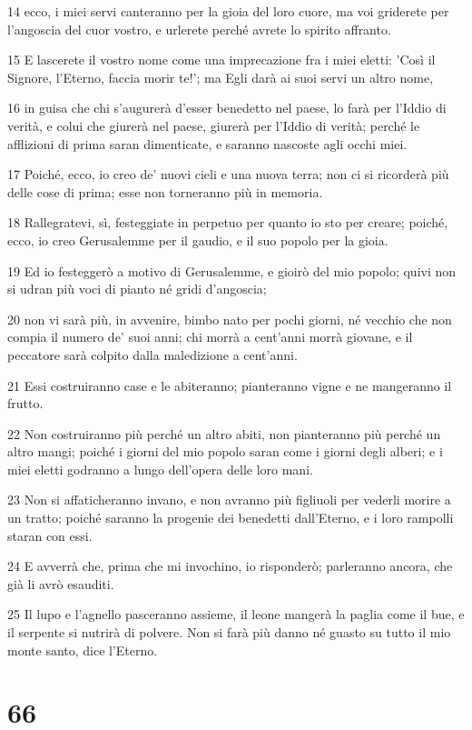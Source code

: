 \par 14 ecco, i miei servi canteranno per la gioia del loro cuore, ma voi griderete per l'angoscia del cuor vostro, e urlerete perché avrete lo spirito affranto.
\par 15 E lascerete il vostro nome come una imprecazione fra i miei eletti: 'Così il Signore, l'Eterno, faccia morir te!'; ma Egli darà ai suoi servi un altro nome,
\par 16 in guisa che chi s'augurerà d'esser benedetto nel paese, lo farà per l'Iddio di verità, e colui che giurerà nel paese, giurerà per l'Iddio di verità; perché le afflizioni di prima saran dimenticate, e saranno nascoste agli occhi miei.
\par 17 Poiché, ecco, io creo de' nuovi cieli e una nuova terra; non ci si ricorderà più delle cose di prima; esse non torneranno più in memoria.
\par 18 Rallegratevi, sì, festeggiate in perpetuo per quanto io sto per creare; poiché, ecco, io creo Gerusalemme per il gaudio, e il suo popolo per la gioia.
\par 19 Ed io festeggerò a motivo di Gerusalemme, e gioirò del mio popolo; quivi non si udran più voci di pianto né gridi d'angoscia;
\par 20 non vi sarà più, in avvenire, bimbo nato per pochi giorni, né vecchio che non compia il numero de' suoi anni; chi morrà a cent'anni morrà giovane, e il peccatore sarà colpito dalla maledizione a cent'anni.
\par 21 Essi costruiranno case e le abiteranno; pianteranno vigne e ne mangeranno il frutto.
\par 22 Non costruiranno più perché un altro abiti, non pianteranno più perché un altro mangi; poiché i giorni del mio popolo saran come i giorni degli alberi; e i miei eletti godranno a lungo dell'opera delle loro mani.
\par 23 Non si affaticheranno invano, e non avranno più figliuoli per vederli morire a un tratto; poiché saranno la progenie dei benedetti dall'Eterno, e i loro rampolli staran con essi.
\par 24 E avverrà che, prima che mi invochino, io risponderò; parleranno ancora, che già li avrò esauditi.
\par 25 Il lupo e l'agnello pasceranno assieme, il leone mangerà la paglia come il bue, e il serpente si nutrirà di polvere. Non si farà più danno né guasto su tutto il mio monte santo, dice l'Eterno.

\chapter{66}

